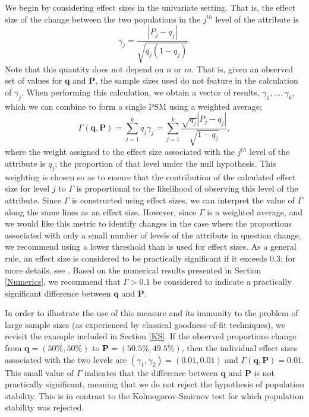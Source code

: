 \documentclass{article}
\theoremstyle{def}
\begin{document}
We begin by considering effect sizes in the univariate setting. That is, the effect size of the change between the two populations in the $j^{th}$ level of the attribute is
\[
    \gamma_j = \frac{|P_j-q_j|}{\sqrt{q_j(1-q_j)}}.
\]
Note that this quantity does not depend on $n$ or $m$. That is, given an observed set of values for $\mathbf{q}$ and $\mathbf{P}$, the sample sizes used do not feature in the calculation of $\gamma_j$. When performing this calculation, we obtain a vector of results, $\gamma_1,\dots,\gamma_k$, which we can combine to form a single PSM using a weighted average;
\begin{equation*}
    \Gamma(\mathbf{q},\mathbf{P}) = \sum_{j=1}^k q_j \gamma_j = \sum_{j=1}^k \frac{\sqrt{q_j}|P_j-q_j|}{\sqrt{1-q_j}},
\end{equation*}
where the weight assigned to the effect size associated with the $j^{th}$ level of the attribute is $q_j$; the proportion of that level under the null hypothesis. This weighting is chosen so as to ensure that the contribution of the calculated effect size for level $j$ to $\Gamma$ is proportional to the likelihood of observing this level of the attribute. Since $\Gamma$ is constructed using effect sizes, we can interpret the value of $\Gamma$ along the same lines as an effect size. However, since $\Gamma$ is a weighted average, and we would like this metric to identify changes in the case where the proportions associated with only a small number of levels of the attribute in question change, we recommend using a lower threshold than is used for effect sizes. As a general rule, an effect size is considered to be practically significant if it exceeds $0.3$; for more details, see \cite{Lew1994}. Based on the numerical results presented in Section \ref{Numerics}, we recommend that $\Gamma>0.1$ be considered to indicate a practically significant difference between $\mathbf{q}$ and $\mathbf{P}$.

In order to illustrate the use of this measure and its immunity to the problem of large sample sizes (as experienced by classical goodness-of-fit techniques), we revisit the example included in Section \ref{KS}. If the observed proportions change from $\mathbf{q}=(50\%,50\%)$ to $\mathbf{P}=(50.5\%,49.5\%)$, then the individual effect sizes associated with the two levels are $(\gamma_1,\gamma_2)=(0.01,0.01)$ and $\Gamma(\mathbf{q},\mathbf{P}) = 0.01$. This small value of $\Gamma$ indicates that the difference between $\mathbf{q}$ and $\mathbf{P}$ is not practically significant, meaning that we do not reject the hypothesis of population stability. This is in contrast to the Kolmogorov-Smirnov test for which population stability was rejected.
\end{document}
